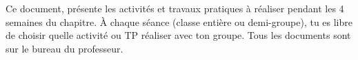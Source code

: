 \teteSndAtom

\vspace*{-40pt}
\vspace*{-8pt}

  Ce document,  présente les activités et travaux pratiques à réaliser pendant les 4 semaines du chapitre.
  À chaque séance (classe entière ou demi-groupe), tu es libre de choisir quelle activité ou TP réaliser avec ton groupe.
  Tous les documents sont sur le bureau du professeur.


\vspace*{-18pt}

